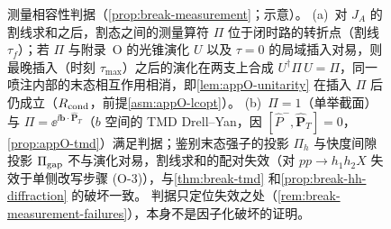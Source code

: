 \begin{figure}[htbp]
\caption{测量相容性判据（\cref{prop:break-measurement}；示意）。
(a)~对 $J_A$ 的割线求和之后，割态之间的测量算符 $\Pi$ 位于闭时路的转折点（割线 $\tau_f$）；若 $\Pi$ 与附录~O 的光锥演化 $U$ 以及 $\tau=0$ 的局域插入对易，则最晚插入（时刻 $\tau_{\max}$）之后的演化在两支上合成 $U^\dagger\Pi\,U=\Pi$，同一喷注内部的末态相互作用相消，即\cref{lem:appO-unitarity} 在插入 $\Pi$ 后仍成立（$R_{\rm cond}$，前提\cref{asm:appO-lcopt}）。
(b)~$\Pi=1$（单举截面）与 $\Pi=\ee^{\ii\mathbf b\cdot\hat{\mathbf P}_T}$（$b$ 空间的 TMD Drell--Yan，因 $[\hat P^-,\hat{\mathbf P}_T]=0$，\cref{prop:appO-tmd}）满足判据；鉴别末态强子的投影 $\Pi_h$ 与快度间隙投影 $\Pi_{\rm gap}$ 不与演化对易，割线求和的配对失效（对 $pp\to h_1h_2X$ 失效于单侧改写步骤 (O-3)），与\cref{thm:break-tmd} 和\cref{prop:break-hh-diffraction} 的破坏一致。
判据只定位失效之处（\cref{rem:break-measurement-failures}），本身不是因子化破坏的证明。}
\label{fig:break-measurement}
\end{figure}

